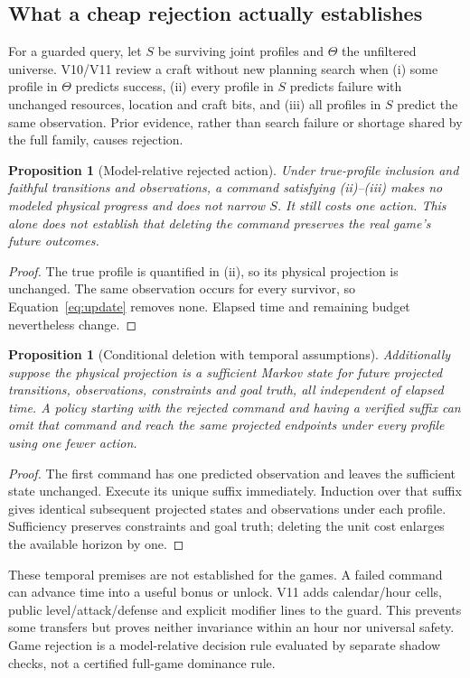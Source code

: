 \documentclass[11pt]{article}
\newtheorem{proposition}[theorem]{Proposition}
\theoremstyle{definition}
\begin{document}
\subsection{What a cheap rejection actually establishes}
For a guarded query, let $S$ be surviving joint profiles and $\Theta$ the
unfiltered universe. V10/V11 review a craft without new planning search when
(i) some profile in $\Theta$ predicts success, (ii) every profile in $S$
predicts failure with unchanged resources, location and craft bits, and
(iii) all profiles in $S$ predict the same observation. Prior evidence, rather
than search failure or shortage shared by the full family, causes rejection.
\begin{proposition}[Model-relative rejected action]\label{prop:reject}
Under true-profile inclusion and faithful transitions and observations, a
command satisfying (ii)--(iii) makes no modeled physical progress and does not
narrow $S$. It still costs one action. This alone does not establish that
deleting the command preserves the real game's future outcomes.
\end{proposition}
\begin{proof}
The true profile is quantified in (ii), so its physical projection is unchanged.
The same observation occurs for every survivor, so Equation~\ref{eq:update}
removes none. Elapsed time and remaining budget nevertheless change.
\end{proof}
\begin{proposition}[Conditional deletion with temporal assumptions]\label{prop:delete}
Additionally suppose the physical projection is a sufficient Markov state for
future projected transitions, observations, constraints and goal truth, all
independent of elapsed time. A policy starting with the rejected command and
having a verified suffix can omit that command and reach the same projected
endpoints under every profile using one fewer action.
\end{proposition}
\begin{proof}
The first command has one predicted observation and leaves the sufficient state
unchanged. Execute its unique suffix immediately. Induction over that suffix
gives identical subsequent projected states and observations under each profile.
Sufficiency preserves constraints and goal truth; deleting the unit cost enlarges
the available horizon by one.
\end{proof}
These temporal premises are not established for the games. A failed command can
advance time into a useful bonus or unlock. V11 adds calendar/hour cells, public
level/attack/defense and explicit modifier lines to the guard. This prevents
some transfers but proves neither invariance within an hour nor universal
safety. Game rejection is a model-relative decision rule evaluated by separate
shadow checks, not a certified full-game dominance rule.
\end{document}
